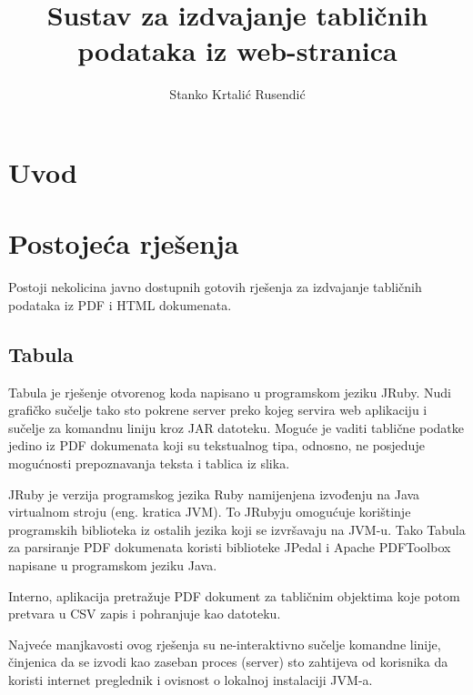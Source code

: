 \documentclass[times, utf8, zavrsni]{fer}
\begin{document}

\title{Sustav za izdvajanje tabličnih podataka iz web-stranica}

\author{Stanko Krtalić Rusendić}

\maketitle

\zahvala{}

\tableofcontents

\chapter{Uvod}



\chapter{Postojeća rješenja}

Postoji nekolicina javno dostupnih gotovih rješenja za izdvajanje tabličnih
podataka iz PDF i HTML dokumenata.

\section{Tabula}

Tabula \cite{tabula_repository} je rješenje otvorenog koda napisano u
programskom jeziku JRuby.
Nudi grafičko sučelje tako sto pokrene server preko kojeg servira web
aplikaciju i sučelje za komandnu liniju kroz JAR datoteku. Moguće je vaditi
tablične podatke jedino iz PDF dokumenata koji su tekstualnog tipa, odnosno,
ne posjeduje mogućnosti prepoznavanja teksta i tablica iz slika.

JRuby je verzija programskog jezika Ruby namijenjena izvođenju na Java
virtualnom stroju (eng. kratica JVM). To JRubyju omogućuje korištinje
programskih biblioteka iz ostalih jezika koji se izvršavaju na JVM-u. Tako
Tabula za parsiranje PDF dokumenata koristi biblioteke JPedal i Apache
PDFToolbox napisane u programskom jeziku Java.

Interno, aplikacija pretražuje PDF dokument za tabličnim objektima koje potom
pretvara u CSV zapis i pohranjuje kao datoteku.

Najveće manjkavosti ovog rješenja su ne-interaktivno sučelje komandne linije,
činjenica da se izvodi kao zaseban proces (server) sto zahtijeva od korisnika
da koristi internet preglednik i ovisnost o lokalnoj instalaciji JVM-a.
\end{document}

